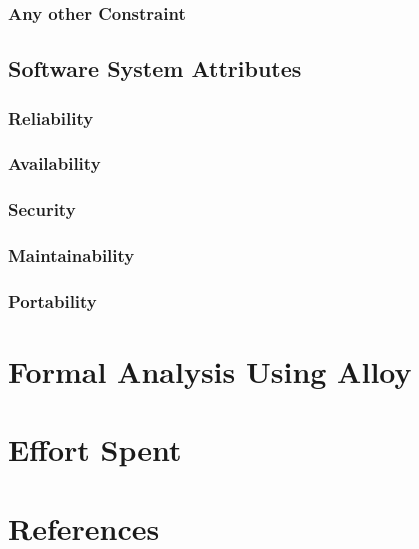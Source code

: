 \documentclass[a4paper]{article}
\begin{document}
\subsubsection{Any other Constraint}

\subsection{Software System Attributes}

\subsubsection{Reliability}

\subsubsection{Availability}

\subsubsection{Security}

\subsubsection{Maintainability}

\subsubsection{Portability}

\section{Formal Analysis Using Alloy}

\section{Effort Spent}

\section{References}
\end{document}
